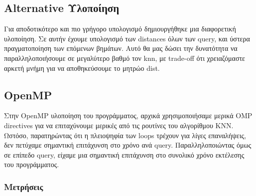 \documentclass[11pt]{scrartcl} %
\begin{document}
\subsection{Alternative Υλοποίηση}
Για αποδοτικότερο και πιο γρήγορο υπολογισμό δημιουργήθηκε μια διαφορετική υλοποίηση. Σε αυτήν έχουμε υπολογισμό των distances όλων των query,
και ύστερα πραγματοποίηση των επόμενων βημάτων. Αυτό θα μας δώσει την δυνατότητα να παραλληλοποιήσουμε σε μεγαλύτερο βαθμό τον knn, με
trade-off ότι χρειαζόμαστε αρκετή μνήμη για να αποθηκεύσουμε το μητρώο dist.

\subsection{OpenMP}

Στην OpenMP υλοποίηση του προγράμματος, αρχικά χρησιμοποιήσαμε μερικά OMP directives
για να επιταχύνουμε μερικές από τις ρουτίνες του αλγορίθμου ΚΝΝ.
Ωστόσο, παρατηρώντας ότι η πλειοψηφία των loops τρέχουν για λίγες επαναλήψεις, δεν πετύχαμε σημαντική επιτάχυνση στο χρόνο ανά query.
Παραλληλοποιώντας όμως σε επίπεδο query, είχαμε μια σημαντική επιτάχυνση στο συνολικό χρόνο εκτέλεσης του προγράμματος.

\subsubsection{Μετρήσεις}
\end{document}
